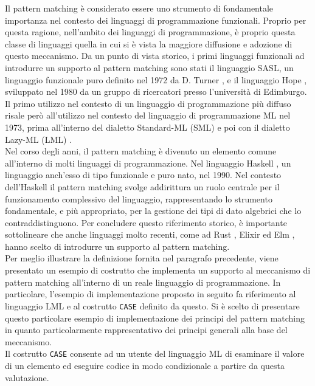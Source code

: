 Il pattern matching è considerato essere uno strumento di fondamentale
importanza nel contesto dei linguaggi di programmazione funzionali. Proprio per
questa ragione, nell’ambito dei linguaggi di programmazione, è proprio questa
classe di linguaggi quella in cui si è vista la maggiore diffusione e adozione
di questo meccanismo. Da un punto di vista storico, i primi linguaggi funzionali
ad introdurre un supporto al pattern matching sono stati il linguaggio SASL, un
linguaggio funzionale puro definito nel 1972 da D. Turner
\cite{DBLP:journals/spe/Turner79}, e il linguaggio Hope
\cite{DBLP:conf/lfp/BurstallMS80}, sviluppato nel 1980 da un gruppo di
ricercatori presso l'università di Edimburgo. Il primo utilizzo nel contesto di
un linguaggio di programmazione più diffuso risale però all’utilizzo nel
contesto del linguaggio di programmazione ML nel 1973, prima all’interno del
dialetto Standard-ML (SML) \cite{milner1997definition} e poi con il dialetto
Lazy-ML (LML) \cite{DBLP:conf/lfp/Augustsson84}.\\

Nel corso degli anni, il pattern matching è divenuto un elemento comune
all'interno di molti linguaggi di programmazione. Nel linguaggio Haskell
\cite{DBLP:conf/hopl/HudakHJW07}, un linguaggio anch'esso di tipo funzionale e
puro nato, nel 1990. Nel contesto dell'Haskell il pattern matching svolge
addirittura un ruolo centrale per il funzionamento complessivo del linguaggio,
rappresentando lo strumento fondamentale, e più appropriato, per la gestione dei
tipi di dato algebrici che lo contraddistinguono. Per concludere questo
riferimento storico, è importante sottolineare che anche linguaggi molto
recenti, come ad Rust \cite{rust2016}, Elixir \cite{laurent2014introducing} ed
Elm \cite{elm2016}, hanno scelto di introdurre un supporto al pattern
matching.\\

Per meglio illustrare la definizione fornita nel paragrafo precedente, viene
presentato un esempio di costrutto che implementa un supporto al meccanismo di
pattern matching all'interno di un reale linguaggio di programmazione. In
particolare, l'esempio di implementazione proposto in seguito fa riferimento al
linguaggio LML e al costrutto \texttt{CASE} definito da questo. Si è scelto di
presentare questo particolare esempio di implementazione dei principi del
pattern matching in quanto particolarmente rappresentativo dei principi generali
alla base del meccanismo.\\

Il costrutto \texttt{CASE} consente ad un utente del linguaggio ML di esaminare
il valore di un elemento ed eseguire codice in modo condizionale a partire da
questa valutazione.

